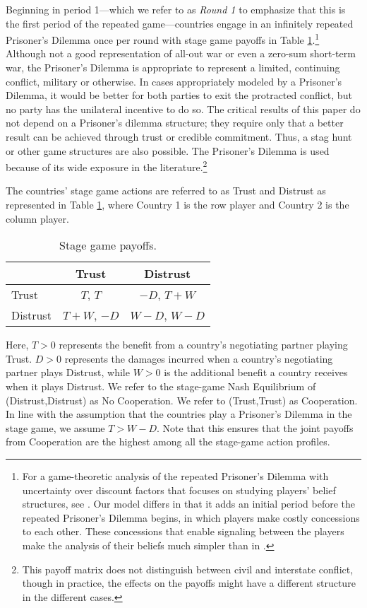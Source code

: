\documentclass[bibtex,autowc]{apsr_submission}
\begin{document}
Beginning in period 1---which we refer to as \textit{Round 1} to emphasize that this is the first period of the repeated game---countries engage in an infinitely repeated Prisoner's Dilemma once per round with stage game payoffs in Table \ref{tab-1}.\footnote{For a game-theoretic analysis of the repeated Prisoner's Dilemma with uncertainty over discount factors that focuses on studying players' belief structures, see \cite{maor2015}. Our model differs in that it adds an initial period before the repeated Prisoner's Dilemma begins, in which players make costly concessions to each other. These concessions that enable signaling between the players make the analysis of their beliefs much simpler than in \cite{maor2015}.} Although not a good representation of all-out war or even a zero-sum short-term war, the Prisoner's Dilemma is appropriate to represent a limited, continuing conflict, military or otherwise. In cases appropriately modeled by a Prisoner's Dilemma, it would be better for both parties to exit the protracted conflict, but no party has the unilateral incentive to do so. The critical results of this paper do not depend on a Prisoner's dilemma structure; they require only that a better result can be achieved through trust or credible commitment. Thus, a stag hunt or other game structures are also possible. The Prisoner's Dilemma is used because of its wide exposure in the literature.\footnote{This payoff matrix does not distinguish between civil and interstate conflict, though in practice, the effects on the payoffs might have a different structure in the different cases.} 

The countries' stage game actions are referred to as Trust and Distrust as represented in Table \ref{tab-1}, where Country 1 is the row player and Country 2 is the column player.


\begin{table}[hbt!]
\sffamily
    \centering
\caption{Stage game payoffs.}\label{tab-1}
\begin{tabular}{l|c|c}
        & Trust & Distrust \\ \hline
	 Trust& $T$, $T$& $-D$, $T+W$ \\ \hline
	Distrust & $T+W$, $-D$& $W-D$, $W-D$
\end{tabular}
\end{table}

Here, $T>0$ represents the benefit from a country's negotiating partner playing Trust. $D>0$ represents the damages incurred when a country's negotiating partner plays Distrust, while $W>0$ is the additional benefit a country receives when it plays Distrust. We refer to the stage-game Nash Equilibrium of (Distrust,Distrust) as No Cooperation. We refer to (Trust,Trust) as Cooperation. In line with the assumption that the countries play a Prisoner's Dilemma in the stage game, we assume $T>W-D$. Note that this ensures that the joint payoffs from Cooperation are the highest among all the stage-game action profiles. 
\end{document}
